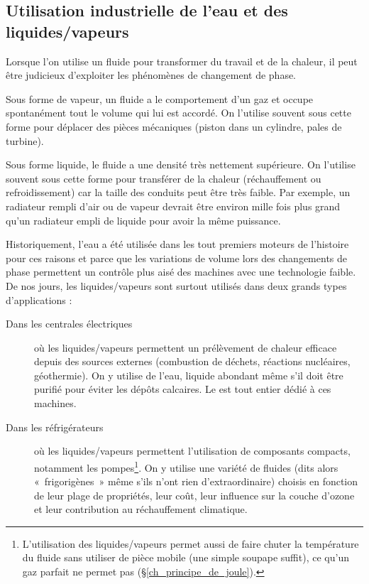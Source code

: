 	
	\subsection{Utilisation industrielle de l’eau et des \mbox{liquides/vapeurs}}
	
		Lorsque l’on utilise un fluide pour transformer du travail et de la chaleur, il peut être judicieux d’exploiter les phénomènes de changement de phase.

		Sous forme de vapeur, un fluide a le comportement d’un gaz et occupe spontanément tout le volume qui lui est accordé. On l’utilise souvent sous cette forme pour déplacer des pièces mécaniques (piston dans un cylindre, pales de turbine).
		
		Sous forme liquide, le fluide a une densité très nettement supérieure. On l’utilise souvent sous cette forme pour transférer de la chaleur (réchauffement ou refroidissement) car la taille des conduits peut être très faible. Par exemple, un radiateur rempli d’air ou de vapeur devrait être environ mille fois plus grand qu’un radiateur empli de liquide pour avoir la même puissance.
		
		Historiquement, l’eau a été utilisée dans les tout premiers moteurs de l’histoire pour ces raisons et parce que les variations de volume lors des changements de phase permettent un contrôle plus aisé des machines avec une technologie faible. De nos jours, les liquides/vapeurs sont surtout utilisés dans deux grands types d’applications :
			\begin{description}
				\item [Dans les centrales électriques] où les liquides/vapeurs permettent un prélèvement de chaleur efficace depuis des sources externes (combustion de déchets, réactions nucléaires, géothermie). On y utilise de l’eau, liquide abondant même s’il doit être purifié pour éviter les dépôts calcaires. Le \coursneuf est tout entier dédié à ces machines.
				\item [Dans les réfrigérateurs] où les liquides/vapeurs permettent l’utilisation de composants compacts, notamment les pompes\footnote{L’utilisation des liquides/vapeurs permet aussi de faire chuter la température du fluide sans utiliser de pièce mobile (une simple soupape suffit), ce qu’un gaz parfait ne permet pas (\S\ref{ch_principe_de_joule}).}. On y utilise une variété de fluides (dits alors «~frigorigènes~» même s’ils n’ont rien d’extraordinaire) choisis en fonction de leur plage de propriétés, leur coût, leur influence sur la couche d’ozone et leur contribution au réchauffement climatique.
			\end{description}

